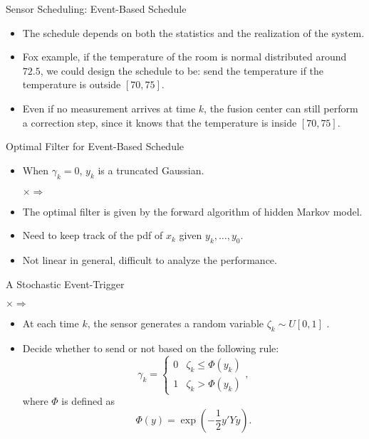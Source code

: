 \documentclass{beamer}
\newlength\figureheight
\newlength\figurewidth
\newcommand{\tikzdir}[1]{tikz/#1.tikz}
\newcommand{\inputtikz}[1]{}}
\begin{document}
  \begin{frame}{Sensor Scheduling: Event-Based Schedule}
    \begin{itemize}
      \item The schedule depends on both the statistics and the realization of the system. 
      \item Fox example, if the temperature of the room is normal distributed around $72.5$, we could design the schedule to be: send the temperature if the temperature is outside $[70,75]$.
      \item Even if no measurement arrives at time $k$, the fusion center can still perform a correction step, since it knows that the temperature is inside $[70,75]$.
    \end{itemize}
  \end{frame}

  \begin{frame}{Optimal Filter for Event-Based Schedule}

    \begin{itemize}
      \item When $\gamma_k = 0$, $y_k$ is a truncated Gaussian.
	\setlength\figureheight{2cm}
	\setlength\figurewidth{3cm}
	\begin{center}
	  \inputtikz{gaussian}$\times$\inputtikz{det}$\Rightarrow$\inputtikz{det2}
	\end{center}
      \item The optimal filter is given by the forward algorithm of hidden Markov model.
      \item Need to keep track of the pdf of $x_k$ given $y_k,\dots,y_0$.
      \item Not linear in general, difficult to analyze the performance.
    \end{itemize}
  \end{frame}

  \begin{frame}{A Stochastic Event-Trigger}
	\setlength\figureheight{2cm}
	\setlength\figurewidth{3cm}
	\begin{center}
	  \inputtikz{gaussian}$\times$\inputtikz{rand}$\Rightarrow$\inputtikz{rand2}
	\end{center}
      \begin{itemize}
	\item At each time $k$, the sensor generates a random variable $\zeta_k\sim U[0,1]$ .
	\item Decide whether to send or not based on the following rule:
	  \begin{displaymath}
	      \gamma_k= \begin{cases}
		0&\zeta_k \leq \Phi(y_k)\\
		1&\zeta_k > \Phi(y_k)
	    \end{cases},
	  \end{displaymath}
	  where $\Phi$ is defined as
	  \begin{displaymath}
	    \Phi(y) = \exp\left( -\frac{1}{2}y'Yy \right). 
	  \end{displaymath}
      \end{itemize}
  \end{frame}
\end{document}

